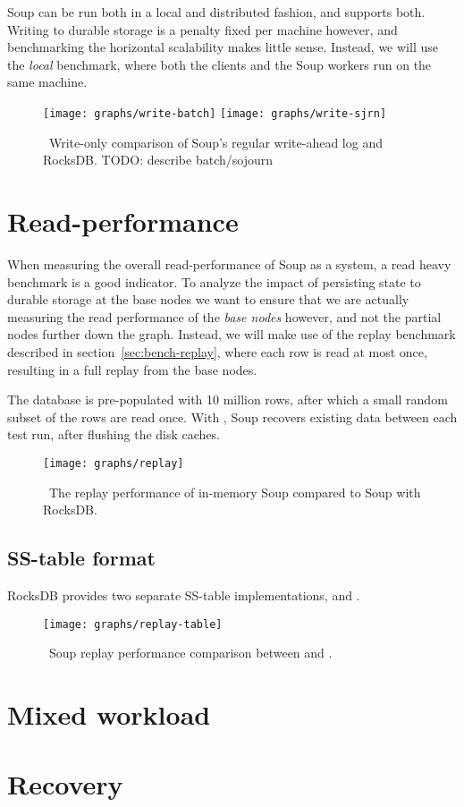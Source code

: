 Soup can be run both in a local and distributed fashion, and 
supports both. Writing to durable storage is a penalty fixed per machine
however, and benchmarking the horizontal scalability makes little sense.
Instead, we will use the \textit{local}  benchmark, where both the
clients and the Soup workers run on the same machine.

\begin{figure}[H]
  \centering
  \texttt{[image: graphs/write-batch]}
  \texttt{[image: graphs/write-sjrn]}
  \caption{\
    Write-only comparison of Soup's regular write-ahead log and RocksDB.\@
    TODO: describe batch/sojourn
  }\label{graph:write}
\end{figure}

\section{Read-performance}

When measuring the overall read-performance of Soup as a system, a read heavy
\code{vote} benchmark is a good indicator. To analyze the impact of persisting
state to durable storage at the base nodes we want to ensure that we are
actually measuring the read performance of the \textit{base nodes} however, and
not the partial nodes further down the graph. Instead, we will make use of the
replay benchmark described in section~\ref{sec:bench-replay}, where each row is
read at most once, resulting in a full replay from the base nodes.

The database is pre-populated with 10 million rows, after which a small random
subset of the rows are read once. With \code{PersistentState}, Soup recovers
existing data between each test run, after flushing the disk caches.

\begin{figure}[H]
  \centering
  \texttt{[image: graphs/replay]}
  \caption{\
    The replay performance of in-memory Soup compared to Soup with RocksDB.\@
  }\label{graph:replay}
\end{figure}

\subsection{SS-table format}

RocksDB provides two separate SS-table implementations, 
and .


\begin{figure}[H]
  \centering
  \texttt{[image: graphs/replay-table]}
  \caption{\
    Soup replay performance comparison between  and
    \code{PlainTable}.
  }\label{graph:replay-table}
\end{figure}



\section{Mixed workload}
\section{Recovery}
